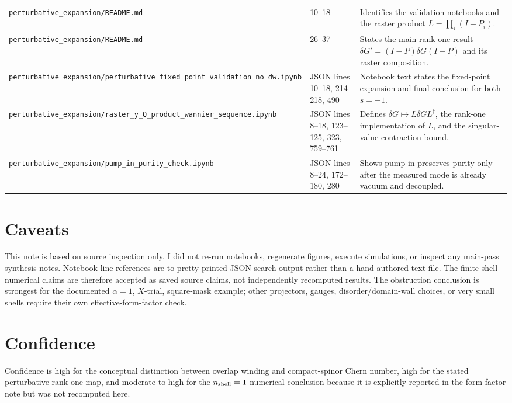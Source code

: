\documentclass[aps,prb,onecolumn,nofootinbib,superscriptaddress]{revtex4-2}
\begin{document}
\begin{table}[h]
\begin{tabular}{p{}p{}p{}}
\texttt{perturbative\_expansion/README.md} & 10--18 & Identifies the validation notebooks and the raster product $L=\prod_i(I-P_i)$. \\
\texttt{perturbative\_expansion/README.md} & 26--37 & States the main rank-one result $\delta G'=(I-P)\delta G(I-P)$ and its raster composition. \\
\texttt{perturbative\_expansion/perturbative\_fixed\_point\_validation\_no\_dw.ipynb} & JSON lines 10--18, 214--218, 490 & Notebook text states the fixed-point expansion and final conclusion for both $s=\pm1$. \\
\texttt{perturbative\_expansion/raster\_y\_Q\_product\_wannier\_sequence.ipynb} & JSON lines 8--18, 123--125, 323, 759--761 & Defines $\delta G\mapsto L\delta G L^\dagger$, the rank-one implementation of $L$, and the singular-value contraction bound. \\
\texttt{perturbative\_expansion/pump\_in\_purity\_check.ipynb} & JSON lines 8--24, 172--180, 280 & Shows pump-in preserves purity only after the measured mode is already vacuum and decoupled. \\
\bottomrule
\end{tabular}
\end{table}

\section{Caveats}

This note is based on source inspection only.  I did not re-run notebooks, regenerate figures, execute simulations, or inspect any main-pass synthesis notes.  Notebook line references are to pretty-printed JSON search output rather than a hand-authored text file.  The finite-shell numerical claims are therefore accepted as saved source claims, not independently recomputed results.  The obstruction conclusion is strongest for the documented $\alpha=1$, $X$-trial, square-mask example; other projectors, gauges, disorder/domain-wall choices, or very small shells require their own effective-form-factor check.

\section{Confidence}

Confidence is high for the conceptual distinction between overlap winding and compact-spinor Chern number, high for the stated perturbative rank-one map, and moderate-to-high for the $n_{\rm shell}=1$ numerical conclusion because it is explicitly reported in the form-factor note but was not recomputed here.
\end{document}
